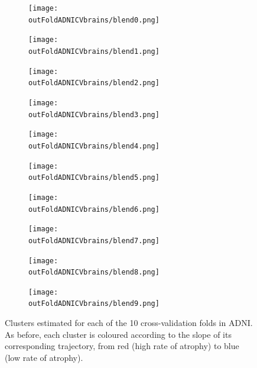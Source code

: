 \documentclass{llncs}
\begin{document}
\begin{figure}[h]
    \centering
    
    \begin{subfigure}[b]{0.19\textwidth}\texttt{[image: \\outFoldADNICVbrains/blend0.png]}\end{subfigure}
    \begin{subfigure}[b]{0.19\textwidth}\texttt{[image: \\outFoldADNICVbrains/blend1.png]}\end{subfigure}
    \begin{subfigure}[b]{0.19\textwidth}\texttt{[image: \\outFoldADNICVbrains/blend2.png]}\end{subfigure}
    \begin{subfigure}[b]{0.19\textwidth}\texttt{[image: \\outFoldADNICVbrains/blend3.png]}\end{subfigure}
    \begin{subfigure}[b]{0.19\textwidth}\texttt{[image: \\outFoldADNICVbrains/blend4.png]}\end{subfigure}
    \begin{subfigure}[b]{0.19\textwidth}\texttt{[image: \\outFoldADNICVbrains/blend5.png]}\end{subfigure}
    \begin{subfigure}[b]{0.19\textwidth}\texttt{[image: \\outFoldADNICVbrains/blend6.png]}\end{subfigure}
    \begin{subfigure}[b]{0.19\textwidth}\texttt{[image: \\outFoldADNICVbrains/blend7.png]}\end{subfigure}
    \begin{subfigure}[b]{0.19\textwidth}\texttt{[image: \\outFoldADNICVbrains/blend8.png]}\end{subfigure}
    \begin{subfigure}[b]{0.19\textwidth}\texttt{[image: \\outFoldADNICVbrains/blend9.png]}\end{subfigure}
    
    \caption{Clusters estimated for each of the 10 cross-validation folds in ADNI. As before, each cluster is coloured according to the slope of its corresponding trajectory, from red (high rate of atrophy) to blue (low rate of atrophy).}
    \label{fig:ADNICVbrains}
\end{figure}
\end{document}
